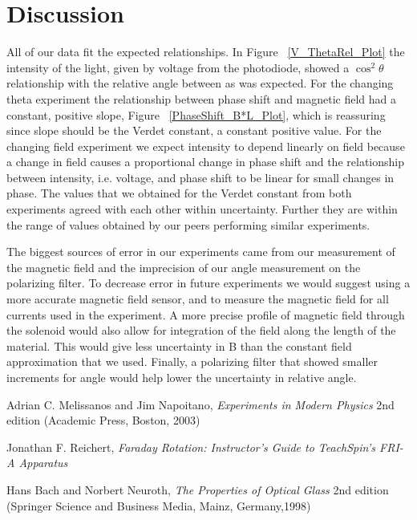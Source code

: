 \documentclass[prb,preprint]{revtex4-1}
\begin{document}
\section{Discussion}

All of our data fit the expected relationships. In Figure ~\ref{V_ThetaRel_Plot} the intensity of the light, given by voltage from the photodiode, showed a $\cos^2\theta$ relationship with the relative angle between as was expected. For the changing theta experiment the relationship between phase shift and magnetic field had a constant, positive slope, Figure ~\ref{PhaseShift_B*L_Plot}, which is reassuring since slope should be the Verdet constant, a constant positive value.  For the changing field experiment we expect intensity to depend linearly on field because a change in field causes a proportional change in phase shift and the relationship between intensity, i.e. voltage, and phase shift to be linear for small changes in phase. The values that we obtained for the Verdet constant from both experiments agreed with each other within uncertainty. Further they are within the range of values obtained by our peers performing similar experiments.

The biggest sources of error in our experiments came from our measurement of the magnetic field and the imprecision of our angle measurement on the polarizing filter. To decrease error in future experiments we would suggest using a more accurate magnetic field sensor, and to measure the magnetic field for all currents used in the experiment. A more precise profile of magnetic field through the solenoid would also allow for integration of the field along the length of the material. This would give less uncertainty in B than the constant field approximation that we used. Finally, a polarizing filter that showed smaller increments for angle would help lower the uncertainty in relative angle. 


\begin{thebibliography}{3}

 Adrian C. Melissanos and Jim Napoitano, \textit{Experiments in Modern Physics} 2nd edition (Academic Press, Boston, 2003)

 Jonathan F. Reichert, \textit{Faraday Rotation: Instructor's Guide to TeachSpin's FRI-A Apparatus}

 Hans Bach and Norbert Neuroth, \textit{The Properties of Optical Glass} 2nd edition (Springer Science and Business Media, Mainz, Germany,1998)

\end{thebibliography}
\end{document}
